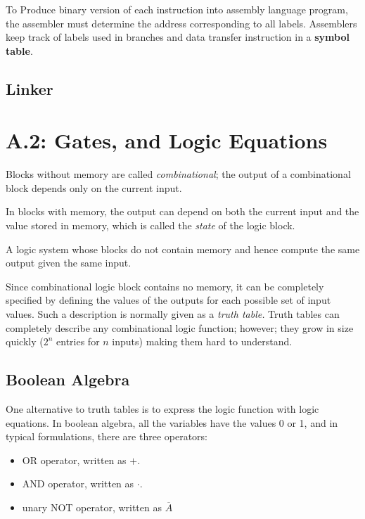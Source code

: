 \documentclass[12pt]{article}
\begin{document}
To Produce binary version of each instruction into assembly language program, the assembler must determine the address corresponding to all labels. Assemblers keep track of labels used in branches and data transfer instruction in a \textbf{symbol table}.

\subsection*{Linker}




\section*{A.2: Gates, and Logic Equations}
Blocks without memory are called \emph{combinational}; the output of a combinational block depends only on the current input.

In blocks with memory, the output can depend on both the current input and the value stored in memory, which is called the \emph{state} of the logic block.

\begin{definition}
    A logic system whose blocks do not contain memory and hence compute the same output given the same input.
\end{definition}

Since combinational logic block contains no memory, it can be completely specified by defining the values of the outputs for each possible set of input values. Such a description is normally given as a \emph{truth table.} Truth tables can completely describe any combinational logic function; however; they grow in size quickly ($2^n$ entries for $n$ inputs) making them hard to understand.

\subsection*{Boolean Algebra}
One alternative to truth tables is to express the logic function with logic equations. In boolean algebra, all the variables have the values 0 or 1, and in typical formulations, there are three operators:

\begin{itemize}
    \item OR operator, written as $+$.
    \item AND operator, written as $\cdot$.
    \item unary NOT operator, written as $\overline{A}$
\end{itemize}
\end{document}
